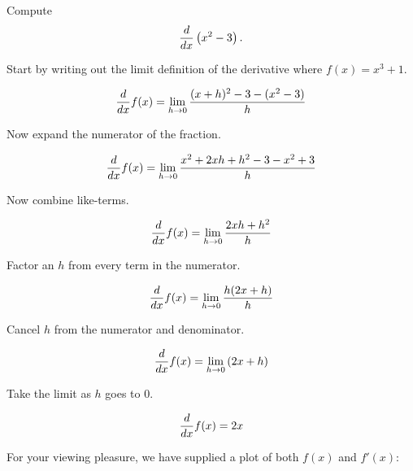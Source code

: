 \documentclass{ximera}
\begin{document}
\begin{example}
Compute 
\[
\frac{d}{dx} \left(x^2 - 3\right).
\]

Start by writing out the limit definition of the derivative where
$f(x) = x^3+1$.
\begin{freeResponse}[given]
\[
\frac{d}{dx} f(x) = \lim_{h\to 0}\frac{(x+h)^2 - 3 - (x^2 - 3)}{h}
\]
\end{freeResponse}
Now expand the numerator of the fraction.
\begin{freeResponse}[given]
\[
\frac{d}{dx} f(x) = \lim_{h\to 0}\frac{x^2 + 2xh + h^2 -3 - x^2 +3}{h}
\]
\end{freeResponse}
Now combine like-terms.
\begin{freeResponse}[given]
\[
\frac{d}{dx} f(x) = \lim_{h\to 0}\frac{2xh + h^2}{h}
\]
\end{freeResponse}
Factor an $h$ from every term in the numerator.
\begin{freeResponse}[given]
\[
\frac{d}{dx} f(x) = \lim_{h\to 0}\frac{h(2x + h)}{h}
\]
\end{freeResponse}
Cancel $h$ from the numerator and denominator.
\begin{freeResponse}[given]
\[
\frac{d}{dx} f(x) = \lim_{h\to 0} \left(2x + h\right)
\]
\end{freeResponse}
Take the limit as $h$ goes to $0$. 
\begin{freeResponse}[given]
\[
\frac{d}{dx} f(x) = 2x
\]
\end{freeResponse}
For your viewing pleasure, we have supplied a plot of both $f(x)$ and
$f'(x)$:
\begin{image}
\end{image}
\end{example}
\end{document}
